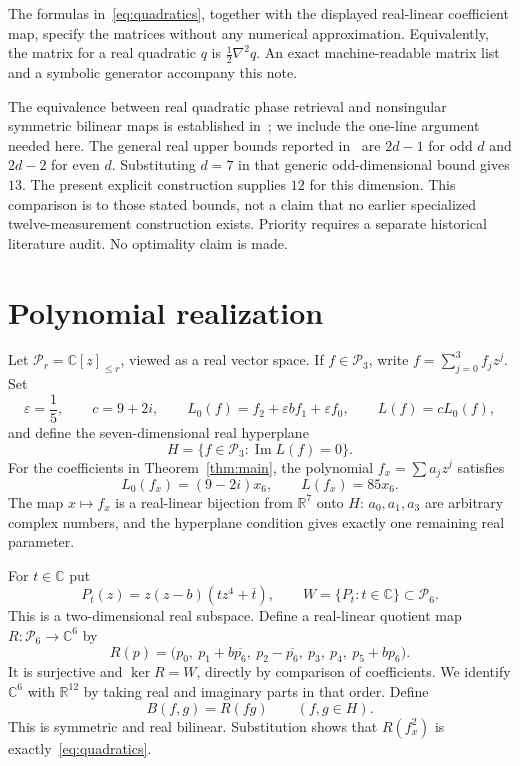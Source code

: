 \documentclass[11pt]{article}
\theoremstyle{remark}\newtheorem{remark}[theorem]{Remark}
\newcommand{\R}{\mathbb R}\newcommand{\C}{\mathbb C}
\newcommand{\im}{\operatorname{Im}}\newcommand{\re}{\operatorname{Re}}
\begin{document}
The formulas in~\eqref{eq:quadratics}, together with the displayed real-linear coefficient map, specify the matrices without any numerical approximation. Equivalently, the matrix for a real quadratic $q$ is $\frac12\nabla^2 q$. An exact machine-readable matrix list and a symbolic generator accompany this note.

The equivalence between real quadratic phase retrieval and nonsingular symmetric bilinear maps is established in~\cite{WX}; we include the one-line argument needed here. The general real upper bounds reported in~\cite{WX,XuSurvey} are $2d-1$ for odd $d$ and $2d-2$ for even $d$. Substituting $d=7$ in that generic odd-dimensional bound gives $13$. The present explicit construction supplies $12$ for this dimension. This comparison is to those stated bounds, not a claim that no earlier specialized twelve-measurement construction exists. Priority requires a separate historical literature audit. No optimality claim is made.

\section{Polynomial realization}
Let $\mathcal P_r=\C[z]_{\le r}$, viewed as a real vector space. If $f\in\mathcal P_3$, write $f=\sum_{j=0}^3 f_jz^j$. Set
\[
 \varepsilon=\frac15,\qquad c=9+2i,\qquad
 L_0(f)=f_2+\varepsilon b f_1+\varepsilon f_0,
 \qquad L(f)=cL_0(f),
\]
and define the seven-dimensional real hyperplane
\[
 H=\{f\in\mathcal P_3:\im L(f)=0\}.
\]
For the coefficients in Theorem~\ref{thm:main}, the polynomial $f_x=\sum a_jz^j$ satisfies
\[
 L_0(f_x)=(9-2i)x_6,\qquad L(f_x)=85x_6.
\]
The map $x\mapsto f_x$ is a real-linear bijection from $\R^7$ onto $H$: $a_0,a_1,a_3$ are arbitrary complex numbers, and the hyperplane condition gives exactly one remaining real parameter.

For $t\in\C$ put
\begin{equation}\label{eq:kernel}
 P_t(z)=z(z-b)(t z^4+\overline t),\qquad
 W=\{P_t:t\in\C\}\subset\mathcal P_6.
\end{equation}
This is a two-dimensional real subspace. Define a real-linear quotient map $R:\mathcal P_6\to\C^6$ by
\begin{equation}\label{eq:quotient}
 R(p)=\bigl(p_0,\ p_1+b\overline{p_6},\ p_2-\overline{p_6},\
 p_3,\ p_4,\ p_5+b p_6\bigr).
\end{equation}
It is surjective and $\ker R=W$, directly by comparison of coefficients. We identify $\C^6$ with $\R^{12}$ by taking real and imaginary parts in that order. Define
\[
 B(f,g)=R(fg)\qquad(f,g\in H).
\]
This is symmetric and real bilinear. Substitution shows that $R(f_x^2)$ is exactly~\eqref{eq:quadratics}.
\end{document}
